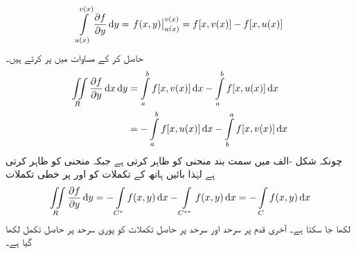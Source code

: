 \begin{align*}
\int\limits_{u(x)}^{v(x)}\frac{\partial f}{\partial y}\dif y=\left.f(x,y)\right|_{u(x)}^{v(x)}=f[x,v(x)]-f[x,u(x)]
\end{align*}
حاصل کر کے مساوات  میں پر کرتے ہیں۔
\begin{align*}
\iint\limits_R \frac{\partial f}{\partial y}\dif x\dif y&=\int\limits_a^b f[x,v(x)]\dif x-\int\limits_a^bf[x,u(x)]\dif x\\
&=-\int\limits_a^b f[x,u(x)]\dif x-\int\limits_b^af[x,v(x)]\dif x
\end{align*}
چونکہ  شکل -الف میں سمت بند منحنی  کو ظاہر کرتی ہے جبکہ  منحنی  کو ظاہر کرتی ہے لہٰذا بائیں ہاتھ کے تکملات کو  اور  پر خطی تکملات
\begin{align}\label{مساوات_خطی_تکمل_مسئلہ_گرین_ثبوت_پ}
\iint\limits_R \frac{\partial f}{\partial y}\dif y=-\int\limits_{C^*}f(x,y)\dif x-\int\limits_{C^{**}}f(x,y)\dif x=-\int\limits_C f(x,y)\dif x
\end{align}
لکھا جا سکتا ہے۔ آخری قدم پر سرحد  اور سرحد  پر حاصل تکملات کو پوری سرحد  پر حاصل تکمل لکھا گیا ہے۔
